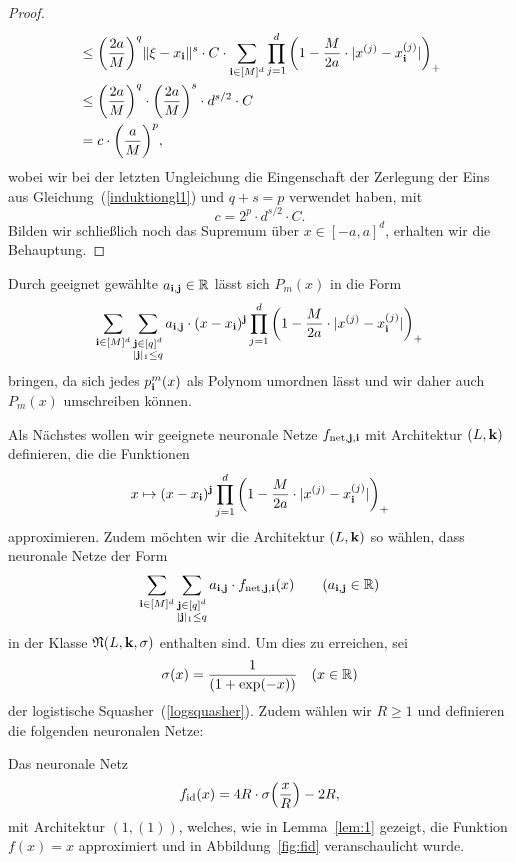 \begin{proof}
\begin{equation*}
\begin{split}
& \leq \bigg(\frac{2a}{M}\bigg)^q \|\xi - x_{\mathbf{i}} \|^s \cdot C \cdot \sum_{\mathbf{i} \in [M]^d} \prod_{j = 1}^d \bigg(1 - \frac{M}{2a} \cdot |x^{(j)} - x_{\mathbf{i}}^{(j)}|\bigg)_+ \\
& \leq \bigg(\frac{2a}{M}\bigg)^q \cdot \bigg(\frac{2a}{M}\bigg)^s \cdot d^{s/2} \cdot C\\
& = c \cdot \bigg(\frac{a}{M}\bigg)^p,
\end{split}
\end{equation*}
wobei wir bei der letzten Ungleichung die Eingenschaft der Zerlegung der Eins aus Gleichung~(\ref{induktiongl1}) und $q + s = p$ verwendet haben, mit 
$$c = 2^p \cdot d^{s/2} \cdot C.$$
Bilden wir schließlich noch das Supremum über $x \in [-a, a]^d$, erhalten wir die Behauptung.
\end{proof}

Durch geeignet gewählte $a_{\mathbf{i}, \mathbf{j}} \in \mathbb{R}$ lässt sich $P_m(x)$ in die Form 
$$\sum_{\mathbf{i} \in [M]^d} \sum_{\substack{ \mathbf{j} \in [q]^d\\|\mathbf{j}|_1 \leq q}} a_{\mathbf{i}, \mathbf{j}} \cdot (x - x_{\mathbf{i}})^{\mathbf{j}} \prod_{j = 1}^d \bigg(1 - \frac{M}{2a} \cdot |x^{(j)} - x_{\mathbf{i}}^{(j)}|\bigg)_+$$
bringen, da sich jedes $p^m_{\mathbf{i}}(x)$ als Polynom umordnen lässt und wir daher auch $P_m(x)$ umschreiben können.

Als Nächstes wollen wir geeignete neuronale Netze $f_{\mathrm{net}, \mathbf{j}, \mathbf{i}}$ mit Architektur $(L, \mathbf{k})$ definieren, die die Funktionen
$$x \mapsto (x - x_{\mathbf{i}})^{\mathbf{j}} \prod_{j = 1}^d \bigg(1 - \frac{M}{2a} \cdot |x^{(j)} - x_{\mathbf{i}}^{(j)}|\bigg)_+$$ approximieren. Zudem möchten wir die Architektur $(L, \mathbf{k})$ so wählen, dass neuronale Netze der Form
$$\sum_{\mathbf{i} \in [M]^d} \sum_{\substack{ \mathbf{j} \in [q]^d\\|\mathbf{j}|_1 \leq q}} a_{\mathbf{i}, \mathbf{j}} \cdot f_{\mathrm{net},\mathbf{j},\mathbf{i}}(x) \qquad (a_{\mathbf{i},\mathbf{j}} \in \mathbb{R})$$ in der Klasse $\mathfrak{N}(L, \mathbf{k}, \sigma)$ enthalten sind.
Um dies zu erreichen, sei $$\sigma(x) = \frac{1}{(1 + \exp(-x))} \quad (x \in \mathbb{R})$$ der logistische Squasher~(\ref{logsquasher}). Zudem wählen wir $R \geq 1$ und definieren die folgenden neuronalen Netze:

Das neuronale Netz
\begin{equation}
\label{def:fid}
f_{\mathrm{id}}(x) = 4R \cdot \sigma\Big(\frac{x}{R}\Big) - 2R,
\end{equation}
mit Architektur $(1, (1))$, welches, wie in Lemma~\ref{lem:1} gezeigt, die Funktion $f(x) = x$ approximiert und in Abbildung~\ref{fig:fid} veranschaulicht wurde.

